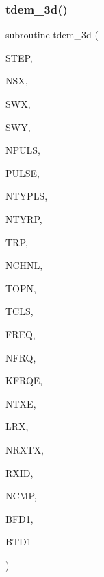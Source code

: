 \subsubsection{\texorpdfstring{tdem\+\_\+3d()}{tdem\_3d()}}
{\footnotesize\ttfamily subroutine tdem\+\_\+3d (\begin{DoxyParamCaption}\item[{integer}]{S\+T\+EP,  }\item[{integer}]{N\+SX,  }\item[{real, dimension(nsx)}]{S\+WX,  }\item[{real, dimension(nsx,3)}]{S\+WY,  }\item[{integer}]{N\+P\+U\+LS,  }\item[{real}]{P\+U\+L\+SE,  }\item[{integer}]{N\+T\+Y\+P\+LS,  }\item[{integer}]{N\+T\+Y\+RP,  }\item[{real, dimension(ntyrp)}]{T\+RP,  }\item[{integer}]{N\+C\+H\+NL,  }\item[{real, dimension(nchnl)}]{T\+O\+PN,  }\item[{real, dimension(nchnl)}]{T\+C\+LS,  }\item[{real, dimension(nfrq)}]{F\+R\+EQ,  }\item[{integer}]{N\+F\+RQ,  }\item[{integer}]{K\+F\+R\+QE,  }\item[{integer}]{N\+T\+XE,  }\item[{integer}]{L\+RX,  }\item[{integer, dimension(ntxe)}]{N\+R\+X\+TX,  }\item[{integer, dimension(lrx,ntxe)}]{R\+X\+ID,  }\item[{integer, dimension(lrx,ntxe)}]{N\+C\+MP,  }\item[{complex, dimension(nfrq,lrx,ntxe,3)}]{B\+F\+D1,  }\item[{real, dimension(nchnl,lrx,ntxe,3)}]{B\+T\+D1 }\end{DoxyParamCaption})}

